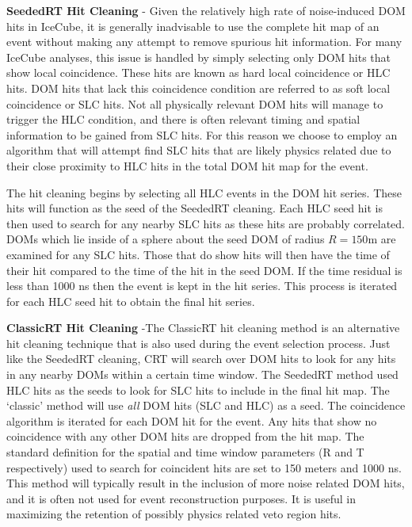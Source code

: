 \documentclass{gatech-thesis}
\begin{document}
\begin{adjustwidth}{1.5em}{1.5em}
\setlength{\parindent}{0pt}
\textbf{SeededRT Hit Cleaning} - Given the relatively high rate of noise-induced DOM hits in IceCube, it is generally inadvisable to use the complete hit map of an event without making any attempt to remove spurious hit information. For many IceCube analyses, this issue is handled by simply selecting only DOM hits that show local coincidence. These hits are known as hard local coincidence or HLC hits. DOM hits that lack this coincidence condition are referred to as soft local coincidence or SLC hits. Not all physically relevant DOM hits will manage to trigger the HLC condition, and there is often relevant timing and spatial information to be gained from SLC hits. For this reason we choose to employ an algorithm that will attempt find SLC hits that are likely physics related due to their close proximity to HLC hits in the total DOM hit map for the event.

The hit cleaning begins by selecting all HLC events in the DOM hit series. These hits will function as the seed of the SeededRT cleaning. Each HLC seed hit is then used to search for any nearby SLC hits as these hits are probably correlated. DOMs which lie inside of a sphere about the seed DOM of radius $R=150$m are examined for any SLC hits. Those that do show hits will then have the time of their hit compared to the time of the hit in the seed DOM. If the time residual is less than 1000 ns then the event is kept in the hit series. This process is iterated for each HLC seed hit to obtain the final hit series.

\textbf{ClassicRT Hit Cleaning} -The ClassicRT hit cleaning method is an alternative hit cleaning technique that is also used during the event selection process. Just like the SeededRT cleaning, CRT will search over DOM hits to look for any hits in any nearby DOMs within a certain time window. The SeededRT method used HLC hits as the seeds to look for SLC hits to include in the final hit map. The `classic' method will use \textit{all} DOM hits (SLC and HLC) as a seed. The coincidence algorithm is iterated for each DOM hit for the event. Any hits that show no coincidence with any other DOM hits are dropped from the hit map. The standard definition for the spatial and time window parameters (R and T respectively) used to search for coincident hits are set to 150 meters and 1000 ns. This method will typically result in the inclusion of more noise related DOM hits, and it is often not used for event reconstruction purposes. It is useful in maximizing the retention of possibly physics related veto region hits.

\end{adjustwidth}
\setlength{\parindent}{17.5pt}
\end{document}

